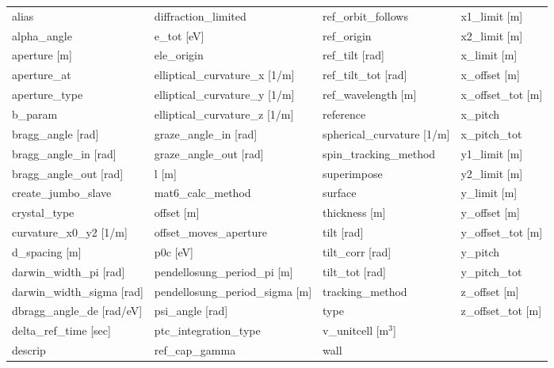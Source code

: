  \begin{tabular}{llll} \toprule
alias                          & diffraction_limited            & ref_orbit_follows              & x1_limit [m]                   \\
alpha_angle                    & e_tot [eV]                     & ref_origin                     & x2_limit [m]                   \\
aperture [m]                   & ele_origin                     & ref_tilt [rad]                 & x_limit [m]                    \\
aperture_at                    & elliptical_curvature_x [1/m]   & ref_tilt_tot [rad]             & x_offset [m]                   \\
aperture_type                  & elliptical_curvature_y [1/m]   & ref_wavelength [m]             & x_offset_tot [m]               \\
b_param                        & elliptical_curvature_z [1/m]   & reference                      & x_pitch                        \\
bragg_angle [rad]              & graze_angle_in [rad]           & spherical_curvature [1/m]      & x_pitch_tot                    \\
bragg_angle_in [rad]           & graze_angle_out [rad]          & spin_tracking_method           & y1_limit [m]                   \\
bragg_angle_out [rad]          & l [m]                          & superimpose                    & y2_limit [m]                   \\
create_jumbo_slave             & mat6_calc_method               & surface                        & y_limit [m]                    \\
crystal_type                   & offset [m]                     & thickness [m]                  & y_offset [m]                   \\
curvature_x0_y2 [1/m]          & offset_moves_aperture          & tilt [rad]                     & y_offset_tot [m]               \\
d_spacing [m]                  & p0c [eV]                       & tilt_corr [rad]                & y_pitch                        \\
darwin_width_pi [rad]          & pendellosung_period_pi [m]     & tilt_tot [rad]                 & y_pitch_tot                    \\
darwin_width_sigma [rad]       & pendellosung_period_sigma [m]  & tracking_method                & z_offset [m]                   \\
dbragg_angle_de [rad/eV]       & psi_angle [rad]                & type                           & z_offset_tot [m]               \\
delta_ref_time [sec]           & ptc_integration_type           & v_unitcell [m$^3$]             &                                \\
descrip                        & ref_cap_gamma                  & wall                           &                                \\
 \bottomrule
 \end{tabular}
 \vfill
 
